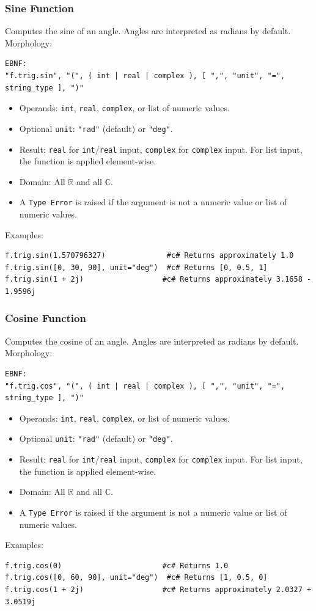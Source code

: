 \subsubsection{Sine Function}
Computes the sine of an angle. Angles are interpreted as radians by default. \\
Morphology:
\begin{verbatim}
EBNF:
"f.trig.sin", "(", ( int | real | complex ), [ ",", "unit", "=", string_type ], ")"
\end{verbatim}
\begin{itemize}
\item Operands: \texttt{int}, \texttt{real}, \texttt{complex}, or list of numeric values.
\item Optional \texttt{unit}: \texttt{"rad"} (default) or \texttt{"deg"}.
\item Result: \texttt{real} for \texttt{int}/\texttt{real} input, \texttt{complex} for \texttt{complex} input. For list input, the function is applied element-wise.
\item Domain: All $\mathbb{R}$ and all $\mathbb{C}$.
\item A \texttt{Type Error} is raised if the argument is not a numeric value or list of numeric values.
\end{itemize}
Examples:
\begin{verbatim}
f.trig.sin(1.570796327)              #c# Returns approximately 1.0
f.trig.sin([0, 30, 90], unit="deg")  #c# Returns [0, 0.5, 1]
f.trig.sin(1 + 2j)                  #c# Returns approximately 3.1658 - 1.9596j
\end{verbatim}

\subsubsection{Cosine Function}
Computes the cosine of an angle. Angles are interpreted as radians by default. \\
Morphology:
\begin{verbatim}
EBNF:
"f.trig.cos", "(", ( int | real | complex ), [ ",", "unit", "=", string_type ], ")"
\end{verbatim}
\begin{itemize}
\item Operands: \texttt{int}, \texttt{real}, \texttt{complex}, or list of numeric values.
\item Optional \texttt{unit}: \texttt{"rad"} (default) or \texttt{"deg"}.
\item Result: \texttt{real} for \texttt{int}/\texttt{real} input, \texttt{complex} for \texttt{complex} input. For list input, the function is applied element-wise.
\item Domain: All $\mathbb{R}$ and all $\mathbb{C}$.
\item A \texttt{Type Error} is raised if the argument is not a numeric value or list of numeric values.
\end{itemize}
Examples:
\begin{verbatim}
f.trig.cos(0)                       #c# Returns 1.0
f.trig.cos([0, 60, 90], unit="deg")  #c# Returns [1, 0.5, 0]
f.trig.cos(1 + 2j)                  #c# Returns approximately 2.0327 + 3.0519j
\end{verbatim}

